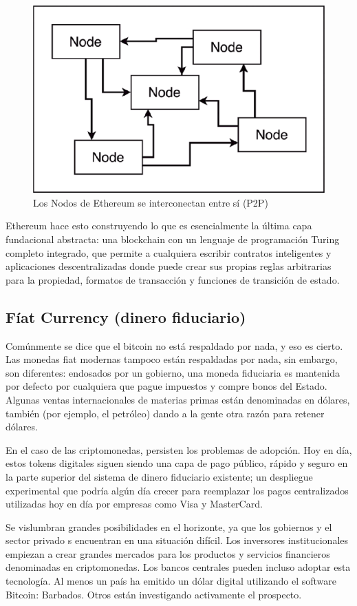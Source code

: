 \begin{figure}
\includegraphics[width=0.7\linewidth]{ethereum-nodes} 
\caption[EthereumNodes]{Los Nodos de Ethereum se interconectan entre sí (P2P)}
\label{fig:ethereum-nodes}
\end{figure} 
 
Ethereum hace esto construyendo lo que es esencialmente la última capa fundacional abstracta: una
blockchain con un lenguaje de programación Turing completo integrado, que permite a cualquiera
escribir contratos inteligentes y aplicaciones descentralizadas donde puede crear sus propias
reglas arbitrarias para la propiedad, formatos de transacción y funciones de transición de estado.


\subsection{Fíat Currency (dinero fiduciario)}
Comúnmente se dice que el bitcoin no está respaldado por nada, y eso es cierto. Las monedas fiat
modernas tampoco están respaldadas por nada, sin embargo, son diferentes: endosados
por un gobierno, una moneda fiduciaria es mantenida por defecto por cualquiera que pague impuestos
y compre bonos del Estado. Algunas ventas internacionales de materias primas están denominadas en
dólares, también (por ejemplo, el petróleo) dando a la gente otra razón para retener dólares.

En el caso de las criptomonedas, persisten los problemas de adopción. Hoy en día, estos tokens
digitales siguen siendo una capa de pago público, rápido y seguro en la parte superior del sistema
de dinero fiduciario existente; un despliegue experimental que podría algún día crecer para
reemplazar los pagos centralizados utilizadas hoy en día por empresas como Visa y MasterCard.

Se vislumbran grandes posibilidades en el horizonte, ya que los gobiernos y el sector privado s
encuentran en una situación difícil. Los inversores institucionales empiezan a crear grandes
mercados para los productos y servicios financieros denominadas en criptomonedas. Los bancos
centrales pueden incluso adoptar esta tecnología. Al menos un país ha emitido un dólar digital
utilizando el software Bitcoin: Barbados. Otros están investigando activamente el prospecto.


